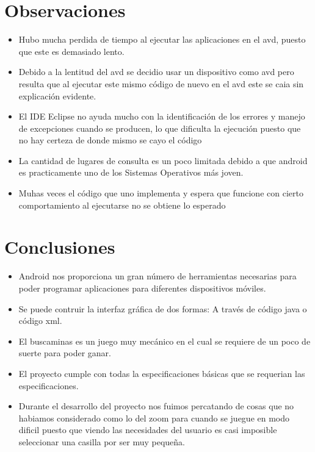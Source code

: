 \documentclass[11pt]{article} %
\begin{document}
\newpage
\section{\fontsize{14}{0} \bf Observaciones}
\begin{itemize}

\item Hubo mucha perdida de tiempo al ejecutar las aplicaciones en el avd, puesto que este es demasiado lento.
\item Debido a la lentitud del avd se decidio usar un dispositivo como avd pero resulta que al ejecutar este mismo código de nuevo en el avd este se caia sin explicación evidente.
\item El IDE Eclipse no ayuda mucho con la identificación de los errores y manejo de excepciones cuando se producen, lo que dificulta la ejecución puesto que no hay certeza de donde mismo se cayo el código
\item La cantidad de lugares de consulta es un poco limitada debido a que android es practicamente uno de los Sistemas Operativos más joven.
\item Muhas veces el código que uno implementa y espera que funcione con cierto comportamiento al ejecutarse no se obtiene lo esperado

\end{itemize}


\section{\fontsize{14}{0} \bf Conclusiones}

\begin{itemize}
\item Android nos proporciona un gran número de herramientas necesarias para poder programar aplicaciones para diferentes dispositivos móviles.
\item Se puede contruir la interfaz gráfica de dos formas:  A través de código java o código xml.
\item El buscaminas es un juego muy mecánico en el cual se requiere de un poco de suerte para poder ganar.
\item El proyecto cumple con todas la especificaciones básicas que se requerian las especificaciones.
\item Durante el desarrollo del proyecto nos fuimos percatando de cosas que no habiamos considerado como lo del zoom para cuando se juegue en modo dificil puesto que viendo las necesidades del usuario es casi imposible seleccionar una casilla por ser muy pequeña.

\end{itemize}
\end{document}
